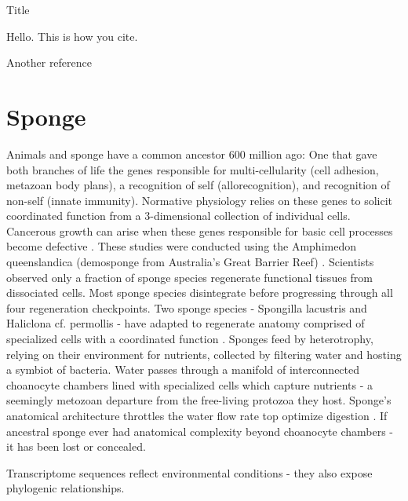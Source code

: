 \documentclass{article}
\begin{document}
	
   Title
   
   Hello. This is how you cite. \cite{gustafsson2016best}
   
   Another reference \cite{hamid2015surface}
   
   \section{Sponge}
Animals and sponge have a common ancestor 600 million ago: One that gave both branches of life the genes responsible for multi-cellularity (cell adhesion, metazoan body plans), a recognition of self (allorecognition), and recognition of non-self (innate immunity). Normative physiology relies on these genes to solicit coordinated function from a 3-dimensional collection of individual cells. Cancerous growth can arise when these genes responsible for basic cell processes become defective \cite{srivastava2010amphimedon}. These studies were conducted using the Amphimedon queenslandica (demosponge from Australia's Great Barrier Reef) \cite{srivastava2010amphimedon}. 
Scientists observed only a fraction of sponge species regenerate functional tissues from dissociated cells. Most sponge species disintegrate before progressing through all four regeneration checkpoints. Two sponge species - Spongilla lacustris and Haliclona cf. permollis - have adapted to regenerate anatomy comprised of specialized cells with a coordinated function \cite{eerkes2015sponge}. 
Sponges feed by heterotrophy, relying on their environment for nutrients, collected by filtering water and hosting a symbiot of bacteria. Water passes through a manifold of interconnected choanocyte chambers lined with specialized cells which capture nutrients - a seemingly metozoan departure from the free-living protozoa they host.  Sponge's anatomical architecture throttles the water flow rate top optimize digestion \cite{riesgo2014analysis}.
If ancestral sponge ever had anatomical complexity beyond choanocyte chambers - it has been lost or concealed. 
 
Transcriptome sequences reflect environmental conditions - they also expose phylogenic relationships. 
\end{document}
